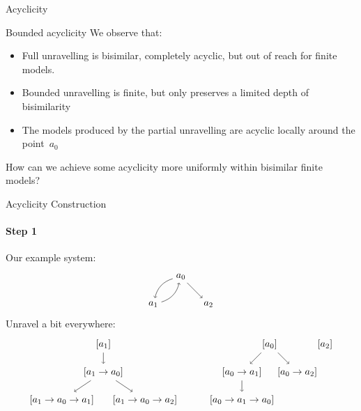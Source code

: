 \documentclass{beamer}
\begin{document}
\begin{frame}{Acyclicity}
\begin{block}{Bounded acyclicity}
We observe that:
\begin{itemize}
\item Full unravelling is bisimilar, completely acyclic, but out of reach for finite models.
\item Bounded unravelling is finite, but only preserves a limited depth of bisimilarity
\item The models produced by the partial unravelling are acyclic locally around the point~$a_0$
\end{itemize}
How can we achieve some acyclicity more uniformly within bisimilar finite models?
\end{block}
\end{frame}

\begin{frame}{Acyclicity Construction}
\framesubtitle{Step 1}
    Our example system:
    \begin{equation*}
        \begin{tikzpicture}
        \path node(a0) {$a_0$} +(-1,-1) node (a1) {$a_1$} +(1,-1) node(a2) {$a_2$};
        \path[->] 
        (a0) edge[bend right] (a1)
        (a1) edge[bend right] (a0)
        (a0) edge (a2);
        \end{tikzpicture}
    \end{equation*}
    Unravel a bit everywhere:
    \begin{equation*}
        \begin{tikzpicture}
        \path 
        node (a) {$[a_0]$} +(-1,-1) 
        node (b) {$[a_0 \rightarrow a_1]$} ++(1,-1)
        node (c) {$[a_0 \rightarrow a_2]$} (b) ++(0,-1)
        node (a') {$[a_0 \rightarrow a_1 \rightarrow a_0]$} (a) ++(-6,0)
        node (b'') {$[a_1]$} ++(0,-1)
        node (a'') {$[a_1 \rightarrow a_0]$} +(-1.5,-1)
        node (b''') {$[a_1 \rightarrow a_0 \rightarrow a_1]$} +(1.5,-1)
        node (c'') {$[a_1 \rightarrow a_0 \rightarrow a_2]$} (a) ++(2,0)
        node (c''') {$[a_2]$};
        
        \path[->]
        (a) edge (b)
        (a) edge (c)
        (b) edge (a')
        (b'') edge (a'')
        (a'') edge (b''')
        (a'') edge (c'');
        \end{tikzpicture}
    \end{equation*}
\end{frame}
\end{document}
